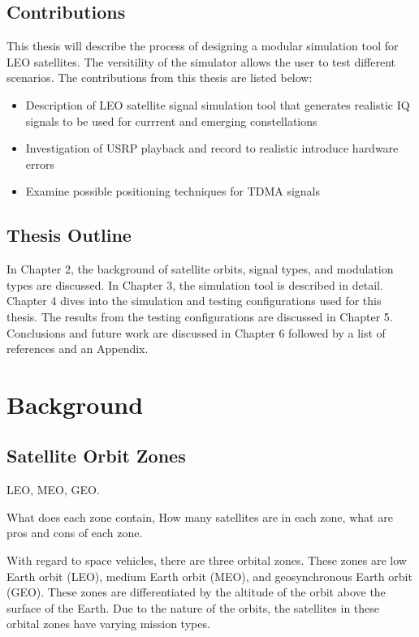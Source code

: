 \documentclass[12pt]{report}
\begin{document}
\section { Contributions}
This thesis will describe the process of designing a modular simulation tool for LEO satellites. The versitility of the simulator allows the user to test different scenarios. 
The contributions from this thesis are listed below:
\begin{itemize}
    \item Description of LEO satellite signal simulation tool that generates realistic IQ signals to be used for currrent and emerging constellations
    \item Investigation of USRP playback and record to realistic introduce hardware errors
    \item Examine possible positioning techniques for TDMA signals
    
\end{itemize}

\section{Thesis Outline}
In Chapter 2, the background of satellite orbits, signal types, and modulation types are discussed. In Chapter 3, the simulation tool is described in detail. Chapter 4 dives into the simulation and testing configurations used for this thesis. The results from the testing configurations are discussed in Chapter 5. Conclusions and future work are discussed in Chapter 6 followed by a list of references and an Appendix.


\chapter{Background}

\section{Satellite Orbit Zones}
LEO, MEO, GEO.

What does each zone contain, How many satellites are in each zone, what are pros and cons of each zone.

With regard to space vehicles, there are three orbital zones. These zones are low Earth orbit (LEO), medium Earth orbit (MEO), and geosynchronous Earth orbit (GEO). These zones are differentiated by the altitude of the orbit above the surface of the Earth. Due to the nature of the orbits, the satellites in these orbital zones have varying mission types. 
\end{document}
